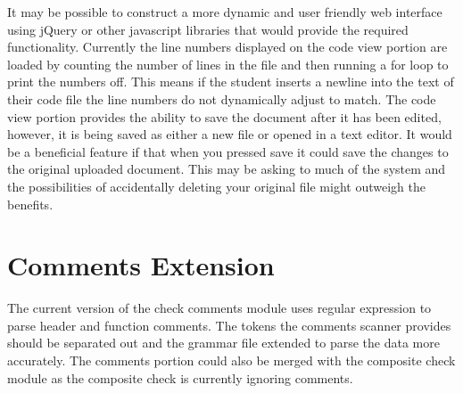 It may be possible to construct a more dynamic and user friendly web 
interface using jQuery or other javascript libraries that would provide the 
required functionality. Currently the line numbers displayed on the code view
portion are loaded by counting the number of lines in the file and then running
a for loop to print the numbers off. This means if the student inserts a 
newline into the text of their code file the line numbers do not dynamically 
adjust to match. The code view portion provides the ability to save the 
document after it has been edited, however, it is being saved as either a new 
file or opened in a text editor. It would be a beneficial feature if that when
you pressed save it could save the changes to the original uploaded document.
This may be asking to much of the system and the possibilities of accidentally
deleting your original file might outweigh the benefits.


\section{Comments Extension}

The current version of the check comments module uses regular expression to 
parse header and function comments. The tokens the comments scanner provides 
should be separated out and the grammar file extended to parse the data more 
accurately. The comments portion could also be merged with the composite check
module as the composite check is currently ignoring comments.
